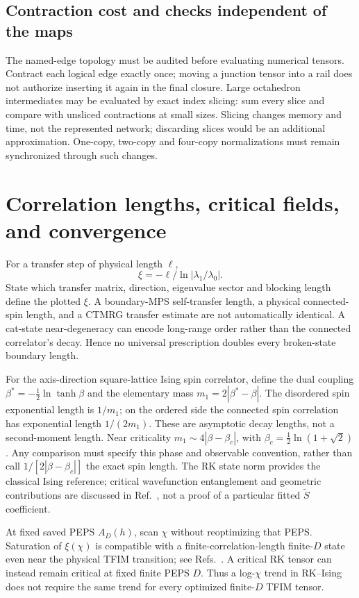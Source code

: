 \documentclass[11pt]{article}
\newcommand{\tS}{\widetilde S}
\begin{document}
\subsection{Contraction cost and checks independent of the maps}
The named-edge topology must be audited before evaluating numerical tensors.
Contract each logical edge exactly once; moving a junction tensor into a rail
does not authorize inserting it again in the final closure. Large octahedron
intermediates may be evaluated by exact index slicing: sum every slice and
compare with unsliced contractions at small sizes. Slicing changes memory and
time, not the represented network; discarding slices would be an additional
approximation. One-copy, two-copy and four-copy normalizations must remain
synchronized through such changes.
\fi

\section{Correlation lengths, critical fields, and convergence}
For a transfer step of physical length $\ell$,
\begin{equation}
 \xi=-\ell/\ln|\lambda_1/\lambda_0|.
\end{equation}
State which transfer matrix, direction, eigenvalue sector and blocking length
define the plotted $\xi$. A boundary-MPS self-transfer length, a physical
connected-spin length, and a CTMRG transfer estimate are not automatically
identical. A cat-state near-degeneracy can encode long-range order rather than
the connected correlator's decay. Hence no universal prescription doubles
every broken-state boundary length.

\ifdetailed
For the axis-direction square-lattice Ising spin correlator, define the dual
coupling $\beta^*=-\tfrac12\ln\tanh\beta$ and the elementary mass
$m_1=2|\beta^*-\beta|$. The disordered spin exponential length is $1/m_1$;
on the ordered side the connected spin correlation has exponential length
$1/(2m_1)$. These are asymptotic decay lengths, not a second-moment length.
Near criticality $m_1\sim4|\beta-\beta_c|$, with
$\beta_c=\tfrac12\ln(1+\sqrt2)$. Any comparison must specify this phase and
observable convention, rather than call $1/[2|\beta-\beta_c|]$ the exact
spin length. The RK state norm provides the classical Ising reference;
critical wavefunction entanglement and geometric contributions are discussed
in Ref.~\cite{fradkin}, not a proof of a particular fitted $\tS$ coefficient.
\fi

At fixed saved PEPS $A_D(h)$, scan $\chi$ without reoptimizing that PEPS.
Saturation of $\xi(\chi)$ is compatible with a finite-correlation-length
finite-$D$ state even near the physical TFIM transition; see
Refs.~\cite{rader,corboz}. A critical RK tensor can instead remain critical
at fixed finite PEPS $D$. Thus a log-$\chi$ trend in RK--Ising does not require
the same trend for every optimized finite-$D$ TFIM tensor.
\end{document}

